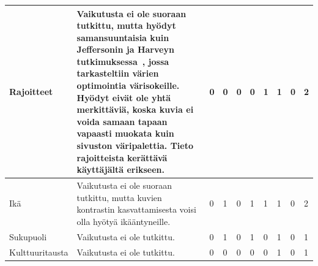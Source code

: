 \documentclass[finnish, 12pt, a4paper, elec, utf8, a-1b]{aaltothesis}
\begin{document}
{\begin{longtable}{p{2.5cm}|p{6cm}|p{0.5cm}p{0.5cm}p{0.5cm}|p{0.5cm}|p{0.5cm}p{0.5cm}p{0.5cm}|p{0.5cm}|}
    \midrule
    Rajoitteet                             & Vaikutusta ei ole suoraan tutkittu, mutta hyödyt samansuuntaisia kuin Jeffersonin ja Harveyn tutkimuksessa~\cite{10.1145/1168987.1168996}, jossa tarkasteltiin värien optimointia värisokeille. Hyödyt eivät ole yhtä merkittäviä, koska kuvia ei voida samaan tapaan vapaasti muokata kuin sivuston väripalettia. Tieto rajoitteista kerättävä käyttäjältä erikseen. & 0                                          & 0                                   & 0                                      & 0                            & 1                                               & 1                                         & 0                                         & 2                            \\
    \midrule
    Ikä                                    & Vaikutusta ei ole suoraan tutkittu, mutta kuvien kontrastin kasvattamisesta voisi olla hyötyä ikääntyneille.                                                                                                                                                                                                                                                          & 0                                          & 1                                   & 0                                      & 1                            & 1                                               & 1                                         & 0                                         & 2                            \\
    \midrule
    Sukupuoli                              & Vaikutusta ei ole tutkittu.                                                                                                                                                                                                                                                                                                                                           & 0                                          & 1                                   & 0                                      & 1                            & 0                                               & 1                                         & 0                                         & 1                            \\
    \midrule
    Kulttuuritausta                        & Vaikutusta ei ole tutkittu.                                                                                                                                                                                                                                                                                                                                           & 0                                          & 0                                   & 0                                      & 0                            & 0                                               & 1                                         & 0                                         & 1                            \\

\end{longtable}}
\end{document}
